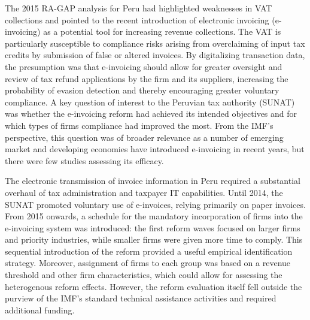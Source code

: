 The 2015 RA-GAP analysis for Peru had highlighted weaknesses in VAT collections and pointed to the recent introduction of electronic invoicing (e-invoicing) as a potential tool for increasing revenue collections. The VAT is particularly susceptible to compliance risks arising from overclaiming of input tax credits by submission of false or altered invoices. By digitalizing transaction data, the presumption was that e-invoicing should allow for greater oversight and review of tax refund applications by the firm and its suppliers, increasing the probability of evasion detection and thereby encouraging greater voluntary compliance. A key question of interest to the Peruvian tax authority (SUNAT) was whether the e-invoicing reform had achieved its intended objectives and for which types of firms compliance had improved the most. From the IMF's perspective, this question was of broader relevance as a number of emerging market and developing economies have introduced e-invoicing in recent years, but there were few studies assessing its efficacy.

The electronic transmission of invoice information in Peru required a substantial overhaul of tax administration and taxpayer IT capabilities. Until 2014, the SUNAT promoted voluntary use of e-invoices, relying primarily on paper invoices. From 2015 onwards, a schedule for the mandatory incorporation of firms into the e-invoicing system was introduced: the first reform waves focused on larger firms and priority industries, while smaller firms were given more time to comply. This sequential introduction of the reform provided a useful empirical identification strategy. Moreover, assignment of firms to each group was based on a revenue threshold and other firm characteristics, which could allow for assessing the heterogenous reform effects. However, the reform evaluation itself fell outside the purview of the IMF's standard technical assistance activities and required additional funding.


